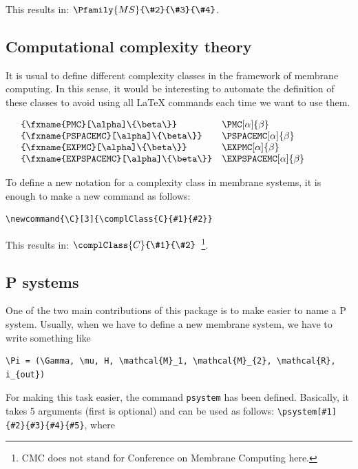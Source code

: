 \documentclass{article}
\begin{document}
This results in: $\Pfamily{MS}{\#2}{\#3}{\#4}$.

\subsection{Computational complexity theory}
\label{sec:comp-compl-theory}

It is usual to define different complexity classes in the framework
of membrane computing. In this sense, it would be interesting to
automate the definition of these classes to avoid using all \LaTeX
commands each time we want to use them.

$
\begin{array}{lll}
    \mbox{} & \verb=\PMC[\alpha]{\beta}= & \PMC[\alpha]{\beta} \\
    \mbox{} & \verb=\PSPACEMC[\alpha]{\beta}= & \PSPACEMC[\alpha]{\beta} \\
    \mbox{} & \verb=\EXPMC[\alpha]{\beta}= & \EXPMC[\alpha]{\beta} \\
    \mbox{} & \verb=\EXPSPACEMC[\alpha]{\beta}= & \EXPSPACEMC[\alpha]{\beta} \\
\end{array}
$

To define a new notation for a complexity class in membrane systems, it is
enough to make a new command as follows:

\begin{verbatim}
\newcommand{\C}[3]{\complClass{C}{#1}{#2}}
\end{verbatim}

This results in: $\complClass{C}{\#1}{\#2}$~\footnote{CMC does not
  stand for Conference on Membrane Computing here.}.

\subsection{P systems}
\label{sec:p-systems}

One of the two main contributions of this package is to make easier to
name a P system. Usually, when we have to define a new membrane
system, we have to write something like 

\begin{verbatim}
\Pi = (\Gamma, \mu, H, \mathcal{M}_1, \mathcal{M}_{2}, \mathcal{R}, i_{out})
\end{verbatim}

For making this task easier, the command \verb=psystem= has been
defined. Basically, it takes 5 arguments (first is optional) and can
be used as follows: \verb=\psystem[#1]{#2}{#3}{#4}{#5}=, where
\end{document}
